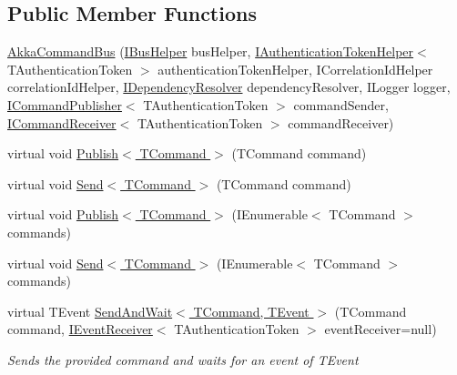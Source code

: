 \subsection*{Public Member Functions}
\begin{DoxyCompactItemize}
\item 
\hyperlink{classCqrs_1_1Akka_1_1Commands_1_1AkkaCommandBus_a765b65e299cc1b32c4c0e7ee405c473d_a765b65e299cc1b32c4c0e7ee405c473d}{Akka\+Command\+Bus} (\hyperlink{interfaceCqrs_1_1Bus_1_1IBusHelper}{I\+Bus\+Helper} bus\+Helper, \hyperlink{interfaceCqrs_1_1Authentication_1_1IAuthenticationTokenHelper}{I\+Authentication\+Token\+Helper}$<$ T\+Authentication\+Token $>$ authentication\+Token\+Helper, I\+Correlation\+Id\+Helper correlation\+Id\+Helper, \hyperlink{interfaceCqrs_1_1Configuration_1_1IDependencyResolver}{I\+Dependency\+Resolver} dependency\+Resolver, I\+Logger logger, \hyperlink{interfaceCqrs_1_1Commands_1_1ICommandPublisher}{I\+Command\+Publisher}$<$ T\+Authentication\+Token $>$ command\+Sender, \hyperlink{interfaceCqrs_1_1Commands_1_1ICommandReceiver}{I\+Command\+Receiver}$<$ T\+Authentication\+Token $>$ command\+Receiver)
\item 
virtual void \hyperlink{classCqrs_1_1Akka_1_1Commands_1_1AkkaCommandBus_a48e1d46035b1e1a3251636b8a03f7dae_a48e1d46035b1e1a3251636b8a03f7dae}{Publish$<$ T\+Command $>$} (T\+Command command)
\item 
virtual void \hyperlink{classCqrs_1_1Akka_1_1Commands_1_1AkkaCommandBus_a696f471533265685f80922e39727288e_a696f471533265685f80922e39727288e}{Send$<$ T\+Command $>$} (T\+Command command)
\item 
virtual void \hyperlink{classCqrs_1_1Akka_1_1Commands_1_1AkkaCommandBus_ab52365375febd74ac078e97af6e6cd24_ab52365375febd74ac078e97af6e6cd24}{Publish$<$ T\+Command $>$} (I\+Enumerable$<$ T\+Command $>$ commands)
\item 
virtual void \hyperlink{classCqrs_1_1Akka_1_1Commands_1_1AkkaCommandBus_a06b7b148493c67d79aaf6b7d59afa487_a06b7b148493c67d79aaf6b7d59afa487}{Send$<$ T\+Command $>$} (I\+Enumerable$<$ T\+Command $>$ commands)
\item 
virtual T\+Event \hyperlink{classCqrs_1_1Akka_1_1Commands_1_1AkkaCommandBus_a10ed94fc318977777e2e6cc970b8953e_a10ed94fc318977777e2e6cc970b8953e}{Send\+And\+Wait$<$ T\+Command, T\+Event $>$} (T\+Command command, \hyperlink{interfaceCqrs_1_1Events_1_1IEventReceiver}{I\+Event\+Receiver}$<$ T\+Authentication\+Token $>$ event\+Receiver=null)
\begin{DoxyCompactList}\small\item\em Sends the provided {\itshape command}  and waits for an event of {\itshape T\+Event}  \end{DoxyCompactList}\item 

\end{DoxyCompactItemize}
